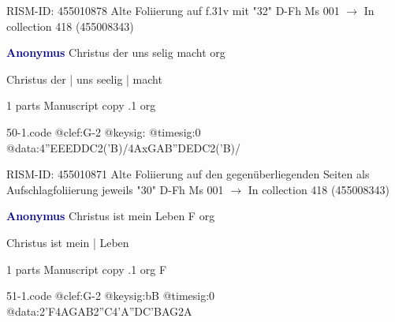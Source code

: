 \documentclass[twocolumn]{book}
\begin{document}
\newline RISM-ID: 455010878
\newline Alte Foliierung auf f.31v mit "32"
\newline D-Fh  Ms 001
\newline $\rightarrow$ In collection 418 (455008343)

\newline \par \vspace{7pt} \textcolor{darkblue}{\textbf{Anonymus  }}
\newline Christus der uns selig macht    
\newline org
\newline \begin{itshape}[f.29v, at left:] Christus der | uns seelig | macht\end{itshape} 
\newline \textcolor{darkblue}{}  1 parts  
\newline Manuscript copy
.1  org  
\begin{filecontents*}{50-1.code}
@clef:G-2
@keysig:
@timesig:0
@data:4''EEEDDC2('B)/4AxGAB''DEDC2('B)/
\end{filecontents*}
\newline
%

\newline RISM-ID: 455010871
\newline Alte Foliierung auf den gegenüberliegenden Seiten als Aufschlagfoliierung jeweils "30"
\newline D-Fh  Ms 001
\newline $\rightarrow$ In collection 418 (455008343)

\newline \par \vspace{7pt} \textcolor{darkblue}{\textbf{Anonymus  }}
\newline Christus ist mein Leben  F  
\newline org
\newline \begin{itshape}[f.14v, at left:] Christus ist mein | Leben\end{itshape} 
\newline \textcolor{darkblue}{}  1 parts  
\newline Manuscript copy
.1  org  F  
\begin{filecontents*}{51-1.code}
@clef:G-2
@keysig:bB
@timesig:0
@data:2'F4AGAB2''C4'A''DC'BAG2A
\end{filecontents*}
\newline
%
\end{document}
